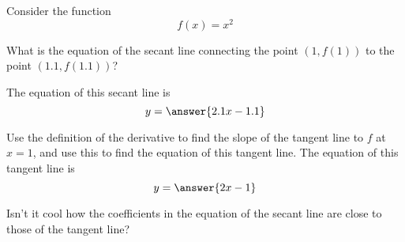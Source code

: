 \documentclass{ximera}
\author{Steven Gubkin}
\begin{document}
\begin{exercise}

	Consider the function \[ f(x) = x^2\]
	
	What is the equation of the secant line connecting the point $(1,f(1))$ to the point $(1.1,f(1.1))$? 

	The equation of this secant line is	\[ y = \answer{ 2.1x - 1.1}\] 
	\begin{exercise}
		Use the definition of the derivative to find the slope of the tangent line to $f$ at $x=1$, and use this to find the equation of this tangent line.
		The equation of this tangent line is
		\[ y = \answer{ 2x - 1}\]
		\begin{feedback}[correct]
			Isn't it cool how the coefficients in the equation of the secant line are close to those of the tangent line?
		\end{feedback}
	\end{exercise}	
\end{exercise}
\end{document}
